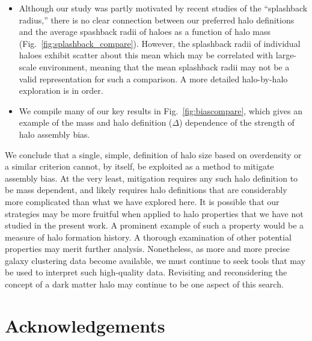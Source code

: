 \documentclass[usenatbib,fleqn]{mnras}
\begin{document}
\begin{itemize}
    \item Although our study was partly motivated by recent studies of the ``splashback radius,'' there is no clear connection between our preferred halo definitions and the average spashback radii of haloes as a function of halo mass (Fig.~\ref{fig:splashback_compare}). However, the splashback radii of individual haloes exhibit scatter about this mean \citep{diemer_etal17} which may be correlated with large-scale environment, meaning that the mean splashback radii may not be a valid representation for such a comparison. A more detailed halo-by-halo exploration is in order.
    
    \item We compile many of our key results in Fig.~\ref{fig:biascompare}, which gives an example of the mass and halo definition ($\Delta$) dependence of the strength of halo assembly bias.
    
\end{itemize}

We conclude that a single, simple, definition of halo size based on overdensity or a similar criterion cannot, by itself, be exploited as a method to mitigate assembly bias. At the very least, mitigation requires any such halo definition to be mass dependent, and likely requires halo definitions that are considerably more complicated than what we have explored here. It is possible that our strategies may be more fruitful when applied to halo properties that we have not studied in the present work. A prominent example of such a property would be a measure of halo formation history. A thorough examination of other potential properties may merit further analysis. Nonetheless, as more and more precise galaxy clustering data become available, we must continue to seek tools that may be used to interpret such high-quality data. Revisiting and reconsidering the concept of a dark matter halo may continue to be one aspect of this search.

\section*{Acknowledgements}
\end{document}

